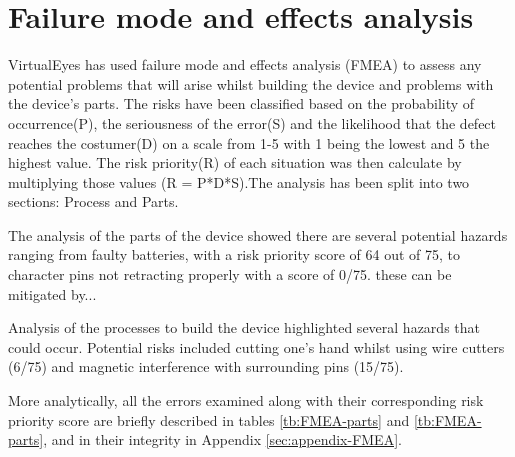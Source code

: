 \section{Failure mode and effects analysis}
VirtualEyes has used failure mode and effects analysis (FMEA) to assess any potential problems that will arise whilst building the device and problems with the device's parts. The risks have been classified based on the probability of occurrence(P), the seriousness of the error(S) and the likelihood that the defect reaches the costumer(D) on a scale from 1-5 with 1 being the lowest and 5 the highest value. The risk priority(R) of each situation was then calculate by multiplying those values (R = P*D*S).The analysis has been split into two sections: Process and Parts. 

The analysis of the parts of the device showed there are several potential hazards ranging from faulty batteries, with a risk priority score of 64 out of 75, to character pins not retracting properly with a score of 0/75. these can be mitigated by... 

Analysis of the processes to build the device highlighted several hazards that could occur. Potential risks included cutting one's hand whilst using wire cutters (6/75) and magnetic interference with surrounding pins (15/75).

More analytically, all the errors examined along with their corresponding risk priority score are briefly described in tables \ref{tb:FMEA-parts} and \ref{tb:FMEA-parts}, and in their integrity in Appendix \ref{sec:appendix-FMEA}.

